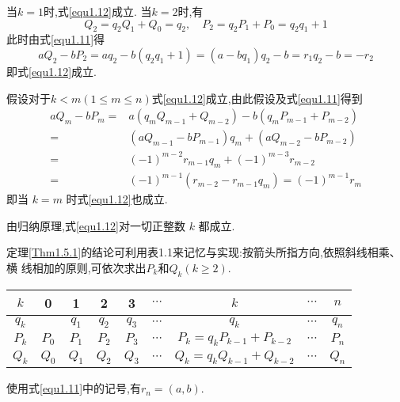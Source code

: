 \proof 当$k=1$时,式\eqref{equ1.12}成立.
当$k=2$时,有
\begin{equation*}
	Q_{2}=q_{2} Q_{1}+Q_{0}=q_{2}, \quad P_{2}=q_{2} P_{1}+P_{0}=q_{2} q_{1}+1
\end{equation*}
此时由式\eqref{equ1.11}得
\begin{equation*}
	a Q_{2}-b P_{2}=a q_{2}-b\left(q_{2} q_{1}+1\right)=\left(a-b q_{1}\right) q_{2}-b=r_{1} q_{2}-b=-r_{2}
\end{equation*}
即式\eqref{equ1.12}成立.

假设对于$k<m(1 \leqslant m \leqslant n)$式\eqref{equ1.12}成立,由此假设及式\eqref{equ1.11}得到
\begin{equation*}
	\begin{aligned}
		a Q_{m}-b P_{m}=& a\left(q_{m} Q_{m-1}+Q_{m-2}\right)-b\left(q_{m} P_{m-1}+P_{m-2}\right)\\
		=&\left(a Q_{m-1}-b P_{m-1}\right) q_{m}+\left(a Q_{m-2}-b P_{m-2}\right)\\
		=&(-1)^{m-2} r_{m-1} q_{m}+(-1)^{m-3} r_{m-2}\\
		=&(-1)^{m-1}\left(r_{m-2}-r_{m-1} q_{m}\right)=(-1)^{m-1} r_{m}
	\end{aligned}
\end{equation*}
即当 $k=m$ 时式\eqref{equ1.12}也成立.

由归纳原理,式\eqref{equ1.12}对一切正整数 $k$ 都成立. 

\entry 定理\ref{Thm1.5.1}的结论可利用表1.1来记忆与实现:按箭头所指方向,依照斜线相乘、横 线相加的原则,可依次求出$P_{k}$和$Q_{k}(k \geqslant 2)$.

\begin{center}
	\begin{tabular}{|c|c|c|c|c|c|c|l|c|}
		\hline$k$ & 0 & 1 & 2 & 3 & $\cdots$ & $k$ & $\cdots$ & $n$ \\
		\hline$q_{k}$ & & $q_{1}$ & $q_{2}$ & $q_{3}$ & $\cdots$ & $q_{k}$ & $\cdots$ & $q_{n}$ \\
		\hline$P_{k}$ & $P_{0}$ & $P_{1}$ & $P_{2}$ & $P_{3}$ & $\cdots$ & $P_{k}=q_{k} P_{k-1}+P_{k-2}$ & $\cdots$ & $P_{n}$ \\
		\hline$Q_{k}$ & $Q_{0}$ & $Q_{1}$ & $Q_{2}$ & $Q_{3}$ & $\cdots$ & $Q_{k}=q_{k} Q_{k-1}+Q_{k-2}$ & $\cdots$ & $Q_{n}$ \\
		\hline
	\end{tabular}
\end{center}

\theorem \label{Thm1.5.2}使用式\eqref{equ1.11}中的记号,有$r_{n}=(a, b)$.

